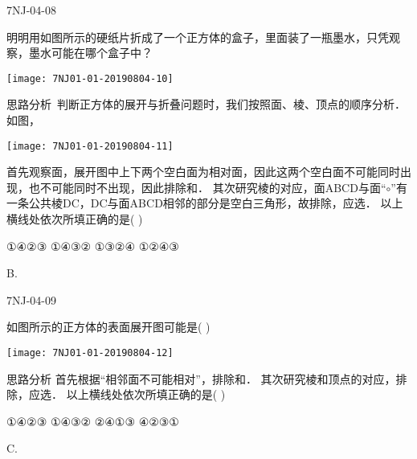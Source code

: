 \begin{defproblem}{7NJ-04-08}%
\begin{onlyproblem}%
明明用如图所示的硬纸片折成了一个正方体的盒子，里面装了一瓶墨水，只凭观察，墨水可能在哪个盒子中？ 
\begin{center}
\texttt{[image: 7NJ01-01-20190804-10]}
\end{center}

思路分析~判断正方体的展开与折叠问题时，我们按照面、棱、顶点的顺序分析． 如图，
\begin{center}
\texttt{[image: 7NJ01-01-20190804-11]}
\end{center}

首先观察面，展开图中上下两个空白面为相对面，因此这两个空白面不可能同时出现，也不可能同时不出现，因此排除\underline{\hspace*{2cm}}和\underline{\hspace*{2cm}}． 其次研究棱的对应，面ABCD与面“$\circ$”有一条公共棱DC，DC与面ABCD相邻的部分是空白三角形，故排除\underline{\hspace*{2cm}}，应选\underline{\hspace*{2cm}}． 以上横线处依次所填正确的是(    ) 

\xx
{①④②③}
{①④③②}
{①③②④}
{①②④③}

\end{onlyproblem}%
\begin{onlysolution}%
\begin{solution}%
B.
\end{solution}%
\end{onlysolution}%
\end{defproblem}




\begin{defproblem}{7NJ-04-09}%
\begin{onlyproblem}%
如图所示的正方体的表面展开图可能是(    ) 
\begin{center}
\texttt{[image: 7NJ01-01-20190804-12]}
\end{center}

思路分析 首先根据“相邻面不可能相对”，排除\underline{\hspace*{2cm}}和\underline{\hspace*{2cm}}． 其次研究棱和顶点的对应，排除\underline{\hspace*{2cm}}，应选\underline{\hspace*{2cm}}． 以上横线处依次所填正确的是(    ) 


\xx
{①④②③}
{①④③②}
{②④①③}
{④②③①}

\end{onlyproblem}%
\begin{onlysolution}%
\begin{solution}%
C.
\end{solution}%
\end{onlysolution}%
\end{defproblem}




